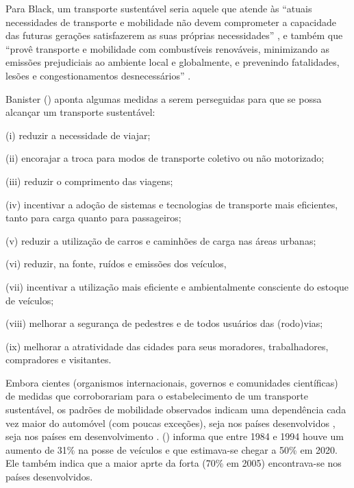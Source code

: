 Para Black, um transporte sustentável seria aquele que atende às ``atuais necessidades de transporte e mobilidade não devem comprometer a capacidade das futuras gerações satisfazerem as suas próprias necessidades'' \cite[p.151]{BLACK1996}, e também que ``provê transporte e mobilidade com combustíveis renováveis, minimizando as emissões prejudiciais ao ambiente local e globalmente, e prevenindo fatalidades, lesões e congestionamentos desnecessários'' \cite[p.12]{BLACK2010}.

Banister (\citeyear{BANISTER2005,BANISTER2008}) aponta algumas medidas a serem perseguidas para que se possa alcançar um transporte sustentável:
\begin{compactitem}[]
\item (i) reduzir a necessidade de viajar;
\item (ii) encorajar a troca para modos de transporte coletivo ou não motorizado;
\item (iii) reduzir o comprimento das viagens;
\item (iv) incentivar a adoção de sistemas e tecnologias de transporte mais eficientes, tanto para carga quanto para passageiros;
\item (v) reduzir a utilização de carros e caminhões de carga nas áreas urbanas;
\item (vi) reduzir, na fonte, ruídos e emissões dos veículos,
\item (vii) incentivar a utilização mais eficiente e ambientalmente consciente do estoque de veículos;
\item (viii) melhorar a segurança de pedestres e de todos usuários das (rodo)vias;
\item (ix) melhorar a atratividade das cidades para seus moradores, trabalhadores, compradores e visitantes.
\end{compactitem}

Embora cientes (organismos internacionais, governos e comunidades científicas) de medidas que corroborariam para o estabelecimento de um transporte sustentável, os padrões de mobilidade observados indicam uma dependência cada vez maior do automóvel (com poucas exceções), seja nos países desenvolvidos \cite{BANISTER2005}, seja nos países em desenvolvimento \cite{VASCONCELLOS2012}.  (\citeyear{BANISTER2005}) informa que entre 1984 e 1994 houve um aumento de 31\% na posse de veículos e que estimava-se chegar a 50\% em 2020. Ele também indica que a maior aprte da forta (70\% em 2005) encontrava-se nos países desenvolvidos.

